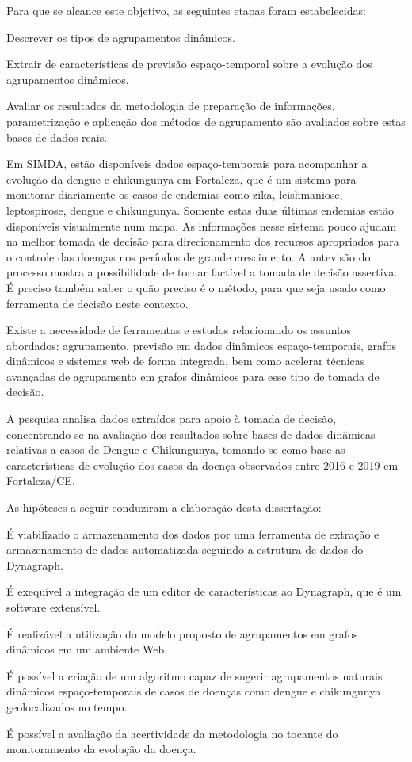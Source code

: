 Para que se alcance este objetivo, as seguintes etapas foram estabelecidas:

\begin{alineas}
    \item Descrever os tipos de agrupamentos dinâmicos.
	\item Extrair de características de previsão espaço-temporal sobre a evolução dos agrupamentos dinâmicos.
	\item Avaliar os resultados da metodologia de preparação de informações, parametrização e aplicação dos métodos de agrupamento são avaliados sobre estas bases de dados reais.
\end{alineas}


Em \acrshort{SIMDA}, estão disponíveis dados espaço-temporais para acompanhar a evolução da dengue e chikungunya em Fortaleza, que é um sistema para monitorar diariamente os casos de endemias como zika, leishmaniose, leptospirose, dengue e chikungunya. Somente estas duas últimas endemias estão disponíveis visualmente num mapa. As informações nesse sistema pouco ajudam na melhor tomada de decisão para direcionamento dos recursos apropriados para o controle das doenças nos períodos de grande crescimento. A antevisão do processo mostra a possibilidade de tornar factível a tomada de decisão assertiva. É preciso também saber o quão preciso é o método, para que seja usado como ferramenta de decisão neste contexto.

Existe a necessidade de ferramentas e estudos relacionando os assuntos abordados: agrupamento, previsão em dados dinâmicos espaço-temporais, grafos dinâmicos e sistemas web de forma integrada, bem como acelerar técnicas avançadas de agrupamento em grafos dinâmicos para esse tipo de tomada de decisão.

A pesquisa analisa dados extraídos para apoio à tomada de decisão, concentrando-se na avaliação dos resultados sobre bases de dados dinâmicas relativas a casos de Dengue e Chikungunya, tomando-se como base as características de evolução dos casos da doença observados entre 2016 e 2019 em Fortaleza/CE.

As hipóteses a seguir conduziram a elaboração desta dissertação:
\begin{alineas}
    \item É viabilizado o armazenamento dos dados por uma ferramenta de extração e armazenamento de dados automatizada seguindo a estrutura de dados do Dynagraph.
	\item É exequível a integração de um editor de características ao Dynagraph, que é um software extensível.	
	\item É realizável a utilização do modelo proposto de agrupamentos em grafos dinâmicos em um ambiente Web.	
	\item É possível a criação de um algoritmo capaz de sugerir agrupamentos naturais dinâmicos espaço-temporais de casos de doenças como dengue e chikungunya geolocalizados no tempo.
	\item É possível a avaliação da acertividade da metodologia no tocante do monitoramento da evolução da doença.
\end{alineas}


